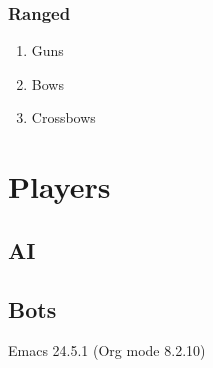 \documentclass[10pt,oneside,x11names]{article}
\begin{document}
\subsubsection{Ranged}
\label{sec:orgheadline107}
\begin{enumerate}
\item Guns
\label{sec:orgheadline104}
\item Bows
\label{sec:orgheadline105}
\item Crossbows
\label{sec:orgheadline106}
\end{enumerate}
\subsection{}
\label{sec:orgheadline109}
\section{Players}
\label{sec:orgheadline113}
\subsection{AI}
\label{sec:orgheadline111}
\subsection{Bots}
\label{sec:orgheadline112}
Emacs 24.5.1 (Org mode 8.2.10)
\end{document}
